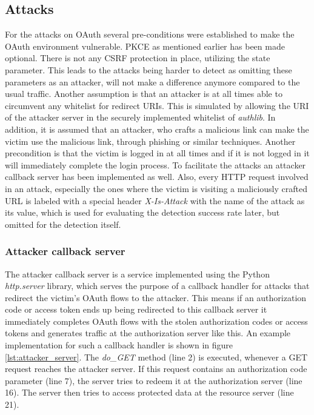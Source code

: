 \subsection{Attacks}
\label{subsec:attacks}
For the attacks on OAuth several pre-conditions were established to make the OAuth environment vulnerable. PKCE as mentioned earlier has been made optional. There is not any CSRF protection in place, utilizing the state parameter. This leads to the attacks being harder to detect as omitting these parameters as an attacker, will not make a difference anymore compared to the usual traffic. Another assumption is that an attacker is at all times able to circumvent any whitelist for redirect URIs. This is simulated by allowing the URI of the attacker server in the securely implemented whitelist of \emph{authlib}. In addition, it is assumed that an attacker, who crafts a malicious link can make the victim use the malicious link, through phishing or similar techniques. Another precondition is that the victim is logged in at all times and if it is not logged in it will immediately complete the login process. To facilitate the attacks an attacker callback server has been implemented as well. Also, every HTTP request involved in an attack, especially the ones where the victim is visiting a maliciously crafted URL is labeled with a special header \emph{X-Is-Attack} with the name of the attack as its value, which is used for evaluating the detection success rate later, but omitted for the detection itself.

\subsubsection{Attacker callback server}
The attacker callback server is a service implemented using the Python \emph{http.server} library, which serves the purpose of a callback handler for attacks that redirect the victim's OAuth flows to the attacker. This means if an authorization code or access token ends up being redirected to this callback server it immediately completes OAuth flows with the stolen authorization codes or access tokens and generates traffic at the authorization server like this. An example implementation for such a callback handler is shown in figure \ref{lst:attacker_server}. The \emph{do\_GET} method (line 2) is executed, whenever a GET request reaches the attacker server. If this request contains an authorization code parameter (line 7), the server tries to redeem it at the authorization server (line 16). The server then tries to access protected data at the resource server (line 21).

